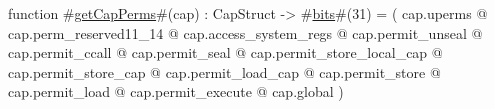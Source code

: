 function #\hyperref[zgetCapPerms]{getCapPerms}#(cap) : CapStruct -> #\hyperref[zbits]{bits}#(31) = 
  (
    cap.uperms
      @ cap.perm_reserved11_14
      @ cap.access_system_regs
      @ cap.permit_unseal
      @ cap.permit_ccall
      @ cap.permit_seal
      @ cap.permit_store_local_cap
      @ cap.permit_store_cap
      @ cap.permit_load_cap
      @ cap.permit_store
      @ cap.permit_load
      @ cap.permit_execute
      @ cap.global
  )
